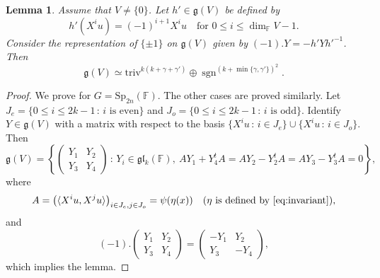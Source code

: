 \documentclass[12pt]{amsart}
\newtheorem{lm}{Lemma}[section]
\theoremstyle{definition}
\theoremstyle{remark}\newtheorem{rmk}[lm]{Remark}
\newcommand{\Sp}{{\mathrm{Sp}}}
\newcommand{\triv}{\mathrm{triv}}
\newcommand{\sgn}{\operatorname{sgn}}
\newcommand{\g}{\mathfrak g}
\newcommand{\gl}{\mathfrak g \mathfrak l}
\newcommand{\C}{\mathbb{F}}
\newcommand{\Y}{\mathbf{Y}}
\renewcommand{\mid}{\,:\,}
\begin{document}
    \begin{lm}
    	\label{lm:descent2}
    	Assume that $V\neq\{0\}$. Let $h'\in\g(V)$ be defined by
    	\begin{equation*}
    		h'(X^iu)=(-1)^{i+1}X^iu\quad\text{for }0\leq i\leq\dim_{\C}V-1.
    	\end{equation*}
    	Consider the representation of $\{\pm 1\}$ on $\g(V)$ given by $(-1).Y=-h'Yh'^{-1}$. Then
    	\begin{equation*}
    		\g(V)\simeq\triv^{k(k+\gamma+\gamma')}\oplus\sgn^{(k+\min\{\gamma,\gamma'\})^2}.
    	\end{equation*}
    \end{lm}
    \begin{proof}
    	We prove for $G=\Sp_{2n}(\C)$. The other cases are proved similarly. Let $J_e=\{0\leq i\leq 2k-1\mid i\text{ is even}\}$ and $J_o=\{0\leq i\leq 2k-1\mid i\text{ is odd}\}$. Identify $Y\in\g(V)$ with a matrix with respect to the basis $\{X^iu\mid i\in J_e\}\cup\{X^iu\mid i\in J_o\}$. Then
    	\begin{equation*}
    		\g(V)=\left\{\left(\begin{matrix}
    			Y_{1}&Y_{2}\\Y_{3}&Y_{4}
    		\end{matrix}\right)\mid Y_{i}\in\gl_k(\C),\ AY_1+Y_4^tA=AY_2-Y_2^tA=AY_3-Y_3^tA=0\right\},
    	\end{equation*}
    	where
    	\begin{equation*}
    		A=\left(\langle X^iu,X^ju\rangle\right)_{i\in J_e,j\in J_o}=\psi(\eta(x))\quad(\eta\text{ is defined by \eqref{eq:invariant}}),
    	\end{equation*}
    	and
    	\begin{equation*}
    		(-1).\left(\begin{matrix}
    			Y_{1}&Y_{2}\\Y_{3}&Y_{4}
    		\end{matrix}\right)=\left(\begin{matrix}
    		-Y_{1}&Y_{2}\\Y_{3}&-Y_{4}
    		\end{matrix}\right),
    	\end{equation*}
    	which implies the lemma.
    \end{proof}
    
\end{document}
